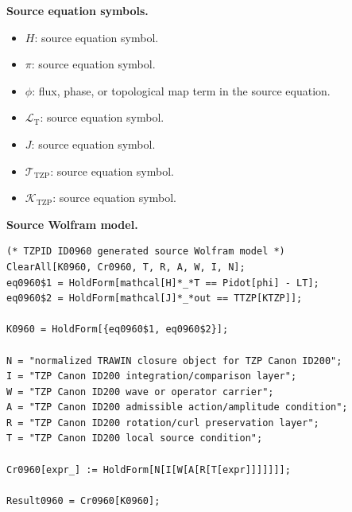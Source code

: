 \begin{minipage}[t]{0.49\linewidth}
\begingroup
\small
\raggedright
\textbf{Source equation symbols.}\par
\begin{itemize}[leftmargin=1.35em,itemsep=1pt,topsep=1pt,parsep=0pt]
    \item $H$: source equation symbol.
    \item $\pi$: source equation symbol.
    \item $\phi$: flux, phase, or topological map term in the source equation.
    \item $\mathcal{L}_{\mathrm{T}}$: source equation symbol.
    \item $J$: source equation symbol.
    \item $\mathcal{T}_{\mathrm{TZP}}$: source equation symbol.
    \item $\mathcal{K}_{\mathrm{TZP}}$: source equation symbol.
\end{itemize}
\endgroup
\end{minipage}\hfill
\begin{minipage}[t]{0.47\linewidth}
\begingroup
\scriptsize
\raggedright
\textbf{Source Wolfram model.}\par
\begin{Verbatim}[fontsize=\tiny,breaklines=true,breakanywhere=true]
(* TZPID ID0960 generated source Wolfram model *)
ClearAll[K0960, Cr0960, T, R, A, W, I, N];
eq0960$1 = HoldForm[mathcal[H]*_*T == Pidot[phi] - LT];
eq0960$2 = HoldForm[mathcal[J]*_*out == TTZP[KTZP]];

K0960 = HoldForm[{eq0960$1, eq0960$2}];

N = "normalized TRAWIN closure object for TZP Canon ID200";
I = "TZP Canon ID200 integration/comparison layer";
W = "TZP Canon ID200 wave or operator carrier";
A = "TZP Canon ID200 admissible action/amplitude condition";
R = "TZP Canon ID200 rotation/curl preservation layer";
T = "TZP Canon ID200 local source condition";

Cr0960[expr_] := HoldForm[N[I[W[A[R[T[expr]]]]]]];

Result0960 = Cr0960[K0960];
\end{Verbatim}
\endgroup
\end{minipage}

